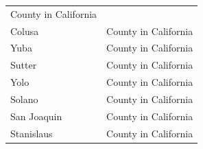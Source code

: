 \documentclass[12pt,]{article}
\begin{document}
\begin{longtable}[]{@{}ll@{}}
\begin{minipage}[t]{0.18\columnwidth}
County in California\strut
\end{minipage}\tabularnewline
\begin{minipage}[t]{0.59\columnwidth}\raggedright\strut
Colusa\strut
\end{minipage} & \begin{minipage}[t]{0.18\columnwidth}\raggedright\strut
County in California\strut
\end{minipage}\tabularnewline
\begin{minipage}[t]{0.59\columnwidth}\raggedright\strut
Yuba\strut
\end{minipage} & \begin{minipage}[t]{0.18\columnwidth}\raggedright\strut
County in California\strut
\end{minipage}\tabularnewline
\begin{minipage}[t]{0.59\columnwidth}\raggedright\strut
Sutter\strut
\end{minipage} & \begin{minipage}[t]{0.18\columnwidth}\raggedright\strut
County in California\strut
\end{minipage}\tabularnewline
\begin{minipage}[t]{0.59\columnwidth}\raggedright\strut
Yolo\strut
\end{minipage} & \begin{minipage}[t]{0.18\columnwidth}\raggedright\strut
County in California\strut
\end{minipage}\tabularnewline
\begin{minipage}[t]{0.59\columnwidth}\raggedright\strut
Solano\strut
\end{minipage} & \begin{minipage}[t]{0.18\columnwidth}\raggedright\strut
County in California\strut
\end{minipage}\tabularnewline
\begin{minipage}[t]{0.59\columnwidth}\raggedright\strut
San Joaquin\strut
\end{minipage} & \begin{minipage}[t]{0.18\columnwidth}\raggedright\strut
County in California\strut
\end{minipage}\tabularnewline
\begin{minipage}[t]{0.59\columnwidth}\raggedright\strut
Stanislaus\strut
\end{minipage} & \begin{minipage}[t]{0.18\columnwidth}\raggedright\strut
County in California\strut
\end{minipage}\tabularnewline

\end{longtable}
\end{document}
